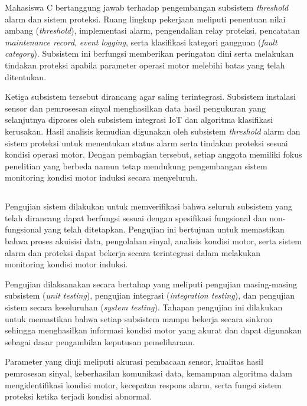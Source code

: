 \documentclass{elsinta}
\begin{document}
Mahasiswa C bertanggung jawab terhadap pengembangan subsistem \textit{threshold} alarm dan sistem proteksi. Ruang lingkup pekerjaan meliputi penentuan nilai ambang (\textit{threshold}), implementasi alarm, pengendalian relay proteksi, pencatatan \textit{maintenance record}, \textit{event logging}, serta klasifikasi kategori gangguan (\textit{fault category}). Subsistem ini berfungsi memberikan peringatan dini serta melakukan tindakan proteksi apabila parameter operasi motor melebihi batas yang telah ditentukan.

Ketiga subsistem tersebut dirancang agar saling terintegrasi. Subsistem instalasi sensor dan pemrosesan sinyal menghasilkan data hasil pengukuran yang selanjutnya diproses oleh subsistem integrasi IoT dan algoritma klasifikasi kerusakan. Hasil analisis kemudian digunakan oleh subsistem \textit{threshold} alarm dan sistem proteksi untuk menentukan status alarm serta tindakan proteksi sesuai kondisi operasi motor. Dengan pembagian tersebut, setiap anggota memiliki fokus penelitian yang berbeda namun tetap mendukung pengembangan sistem monitoring kondisi motor induksi secara menyeluruh.



\subsection{\SystemTestingTitle}


Pengujian sistem dilakukan untuk memverifikasi bahwa seluruh subsistem yang telah dirancang dapat berfungsi sesuai dengan spesifikasi fungsional dan non-fungsional yang telah ditetapkan. Pengujian ini bertujuan untuk memastikan bahwa proses akuisisi data, pengolahan sinyal, analisis kondisi motor, serta sistem alarm dan proteksi dapat bekerja secara terintegrasi dalam melakukan monitoring kondisi motor induksi.

Pengujian dilaksanakan secara bertahap yang meliputi pengujian masing-masing subsistem (\textit{unit testing}), pengujian integrasi (\textit{integration testing}), dan pengujian sistem secara keseluruhan (\textit{system testing}). Tahapan pengujian ini dilakukan untuk memastikan bahwa setiap subsistem mampu bekerja secara sinkron sehingga menghasilkan informasi kondisi motor yang akurat dan dapat digunakan sebagai dasar pengambilan keputusan pemeliharaan.

Parameter yang diuji meliputi akurasi pembacaan sensor, kualitas hasil pemrosesan sinyal, keberhasilan komunikasi data, kemampuan algoritma dalam mengidentifikasi kondisi motor, kecepatan respons alarm, serta fungsi sistem proteksi ketika terjadi kondisi abnormal.
\end{document}
